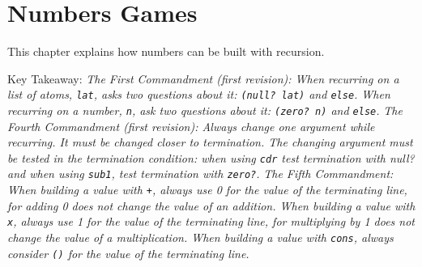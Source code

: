 \documentclass[11pt]{article}
\begin{document}
\newpage

\section{Numbers Games}
\label{sec:orgd22275d}

This chapter explains how numbers can be built with recursion.

\vspace{1em}

Key Takeaway:
\emph{The First Commandment (first revision): When recurring on a list of atoms, \texttt{lat}, asks two questions about it: \texttt{(null? lat)} and \texttt{else}. When
recurring on a number, \texttt{n}, ask two questions about it: \texttt{(zero? n)} and \texttt{else}.}
\vspace{0.5em}
\emph{The Fourth Commandment (first revision): Always change one argument while recurring. It must be changed closer to termination. The changing
argument must be tested in the termination condition: when using \texttt{cdr} test termination with null? and when using \texttt{sub1}, test termination with \texttt{zero?}.}
\vspace{0.5em}
\emph{The Fifth Commandment: When building a value with \texttt{+}, always use 0 for the value of the terminating line, for adding 0 does not change the
value of an addition. When building a value with \texttt{x}, always use 1 for the value of the terminating line, for multiplying by 1 does not change the value of a multiplication. When building a value with \texttt{cons}, always consider \texttt{()} for the value of the terminating line.}

\vspace{1em}
\end{document}
